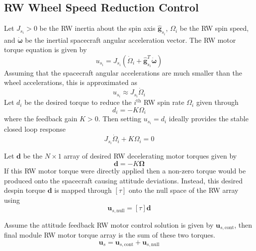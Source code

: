 \subsection{RW Wheel Speed Reduction Control}
Let $J_{s_{i}}>0$ be the RW inertia about the spin axis $\hat{\bm g}_{s_{i}}$, $\Omega_{i}$ be the RW spin speed, and $\dot{\bm \omega}$ be the inertial spacecraft angular acceleration vector.  The RW motor torque equation is given by\cite{schaub}
\begin{equation}
	u_{s_{i}} = J_{s_{i}} (\dot\Omega_{i} + \hat{\bm g}_{s_{i}}^{T} \dot{\bm \omega} )
\end{equation}
Assuming that the spacecraft angular accelerations are much smaller than the wheel accelerations, this is approximated as
\begin{equation}
	u_{s_{i}} \approx J_{s_{i}} \dot\Omega_{i}
\end{equation}
Let $d_{i}$ be the desired torque to reduce the $i^{\text{th}}$ RW spin rate $\Omega_{i}$ given through
\begin{equation}
	d_{i} = - K \Omega_{i}
\end{equation}
where the feedback gain $K>0$.  Then setting $u_{s_{i}} = d_{i}$ ideally provides the stable closed loop response
\begin{equation}
	J_{s_{i}} \dot\Omega_{i} + K\Omega_{i} = 0
\end{equation}



Let $\bm d$ be the $N\times 1$ array of desired RW decelerating motor torques given by
\begin{equation}
	\bm d = -K \bm\Omega
\end{equation}
If this RW motor torque were directly applied then a non-zero torque would be produced onto the spacecraft causing attitude deviations.  Instead, this desired despin torque $\bm d$ is mapped through $[\tau]$ onto the null space of the RW array using
\begin{equation}
	\bm u_{s,\text{null}} = [\tau] \bm d
\end{equation}

Assume the attitude feedback RW motor control solution is given by $\bm u_{s,\text{cont}}$, then final module RW motor torque array is the sum of these two torques.
\begin{equation}
	\bm u_{s} = \bm u_{s,\text{cont}} + \bm u_{s,\text{null}} 
\end{equation}




